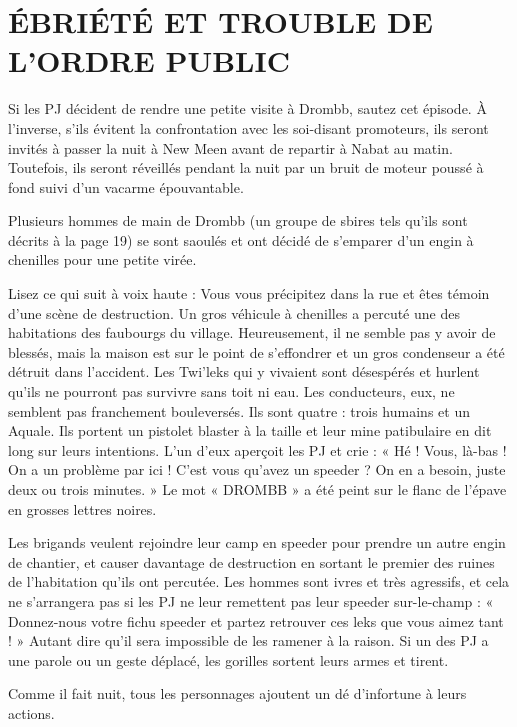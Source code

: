 \documentclass[a4paper,10pt,twoside,twocolumn,openany]{book}
\begin{document}
\section{ÉBRIÉTÉ ET TROUBLE
DE L’ORDRE PUBLIC}

Si les PJ décident de rendre une petite visite à Drombb,
sautez cet épisode. À l’inverse, s’ils évitent la confrontation avec les soi-disant promoteurs, ils seront invités
à passer la nuit à New Meen avant de repartir à Nabat
au matin. Toutefois, ils seront réveillés pendant la nuit
par un bruit de moteur poussé à fond suivi d’un vacarme
épouvantable.

Plusieurs hommes de main de Drombb (un groupe
de sbires tels qu’ils sont décrits à la page 19) se sont
saoulés et ont décidé de s’emparer d’un engin à chenilles
pour une petite virée.

\begin{quotebox}
    
Lisez ce qui suit à voix haute :
Vous vous précipitez dans la rue et êtes témoin
d’une scène de destruction. Un gros véhicule à chenilles a percuté une des habitations des faubourgs
du village. Heureusement, il ne semble pas y avoir
de blessés, mais la maison est sur le point de s’effondrer et un gros condenseur a été détruit dans
l’accident. Les Twi’leks qui y vivaient sont désespérés et hurlent qu’ils ne pourront pas survivre sans
toit ni eau. Les conducteurs, eux, ne semblent pas
franchement bouleversés. Ils sont quatre : trois humains et un Aquale. Ils portent un pistolet blaster à
la taille et leur mine patibulaire en dit long sur leurs
intentions. L’un d’eux aperçoit les PJ et crie : « Hé !
Vous, là-bas ! On a un problème par ici ! C’est vous
qu’avez un speeder ? On en a besoin, juste deux ou
trois minutes. » Le mot « DROMBB » a été peint sur
le flanc de l’épave en grosses lettres noires.
\end{quotebox}

Les brigands veulent rejoindre leur camp en speeder
pour prendre un autre engin de chantier, et causer davantage de destruction en sortant le premier des ruines
de l’habitation qu’ils ont percutée. Les hommes sont
ivres et très agressifs, et cela ne s’arrangera pas si les
PJ ne leur remettent pas leur speeder sur-le-champ :
« Donnez-nous votre fichu speeder et partez retrouver
ces leks que vous aimez tant ! » Autant dire qu’il sera
impossible de les ramener à la raison. Si un des PJ a une
parole ou un geste déplacé, les gorilles sortent leurs
armes et tirent.

Comme il fait nuit, tous les personnages ajoutent un dé
d’infortune \setback à leurs actions.
\end{document}
